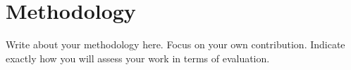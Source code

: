 \section{Methodology}
\label{sec:methodology}
Write about your methodology here. Focus on your own contribution. Indicate exactly how you will assess your work in terms of evaluation.

